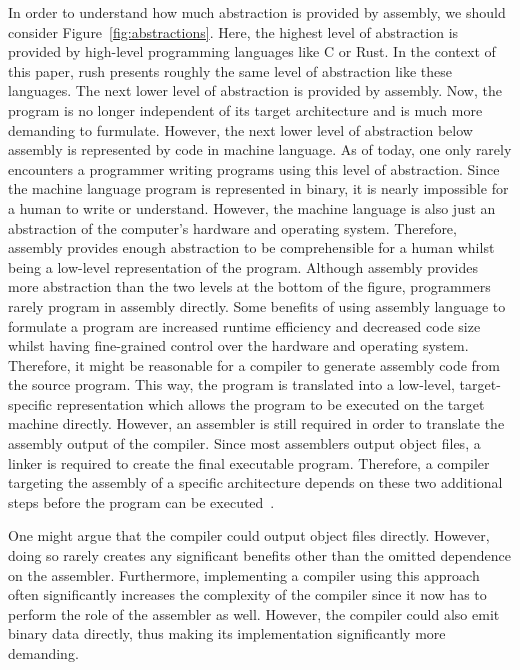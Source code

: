 In order to understand how much abstraction is provided by assembly, we should consider Figure~\ref{fig:abstractions}.
Here, the highest level of abstraction is provided by high-level programming languages like C or Rust.
In the context of this paper, rush presents roughly the same level of abstraction like these languages.
The next lower level of abstraction is provided by assembly.
Now, the program is no longer independent of its target architecture and is much more demanding to furmulate.
However, the next lower level of abstraction below assembly is represented by code in machine language.
As of today, one only rarely encounters a programmer writing programs using this level of abstraction.
Since the machine language program is represented in binary, it is nearly impossible for a human to write or understand.
However, the machine language is also just an abstraction of the computer's hardware and operating system.
Therefore, assembly provides enough abstraction to be comprehensible for a human whilst being a low-level representation of the program.
Although assembly provides more abstraction than the two levels at the bottom of the figure, programmers rarely program in assembly directly.
Some benefits of using assembly language to formulate a program are increased runtime efficiency and decreased code size whilst having fine-grained control over the hardware and operating system.
Therefore, it might be reasonable for a compiler to generate assembly code from the source program.
This way, the program is translated into a low-level, target-specific representation which allows the program to be executed on the target machine directly.
However, an assembler is still required in order to translate the assembly output of the compiler.
Since most assemblers output object files, a linker is required to create the final executable program.
Therefore, a compiler targeting the assembly of a specific architecture depends on these two additional steps before the program can be executed~\cite[p.~5-6]{Dandamudi2005}.

One might argue that the compiler could output object files directly.
However, doing so rarely creates any significant benefits other than the omitted dependence on the assembler.
Furthermore, implementing a compiler using this approach often significantly increases the complexity of the compiler since it now has to perform the role of the assembler as well.
However, the compiler could also emit binary data directly, thus making its implementation significantly more demanding.

